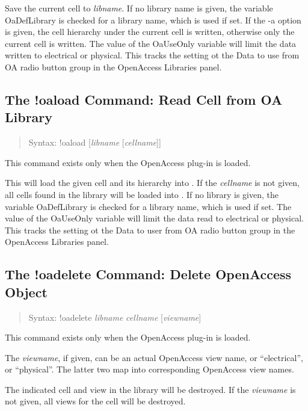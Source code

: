 Save the current cell to {\it libname\/}.  If no library name is
given, the variable {\et OaDefLibrary} is checked for a library name,
which is used if set.  If the {\vt -a} option is given, the cell
hierarchy under the current cell is written, otherwise only the
current cell is written.  The value of the {\et OaUseOnly} variable
will limit the data written to electrical or physical.  This tracks
the setting ot the {\cb Data to use from OA} radio button group in the
{\cb OpenAccess Libraries} panel.

\subsection{The {\cb !oaload} Command: Read Cell from OA Library}
\begin{quote}
Syntax: {\vt !oaload} [{\it libname\/} [{\it cellname\/}]]
\end{quote}
This command exists only when the OpenAccess plug-in is loaded.

This will load the given cell and its hierarchy into {\Xic}.  If the
{\it cellname} is not given, all cells found in the library will be
loaded into {\Xic}.  If no library is given, the variable {\et
OaDefLibrary} is checked for a library name, which is used if set. 
The value of the {\et OaUseOnly} variable will limit the data read to
electrical or physical.  This tracks the setting ot the {\cb Data to
user from OA} radio button group in the {\cb OpenAccess Libraries}
panel.

\subsection{The {\cb !oadelete} Command: Delete OpenAccess Object}
\begin{quote}
Syntax: {\vt !oadelete} {\it libname} {\it cellname} [{\it viewname\/}]
\end{quote}
This command exists only when the OpenAccess plug-in is loaded.

The {\it viewname}, if given, can be an actual OpenAccess view name,
or ``{\vt electrical}'', or ``{\vt physical}''.  The latter two map
into corresponding OpenAccess view names.

The indicated cell and view in the library will be destroyed.  If the
{\it viewname} is not given, all views for the cell will be destroyed.

